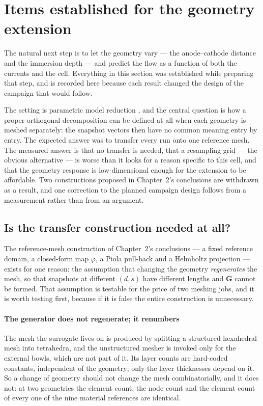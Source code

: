 \documentclass[11pt,a4paper]{article}
\newcommand{\vect}[1]{\mathbf{#1}}
\theoremstyle{plain}
\theoremstyle{definition}
\theoremstyle{remark}
\begin{document}
\section{Items established for the geometry extension}
\label{sec:geometry}

The natural next step is to let the geometry vary --- the anode--cathode distance
and the immersion depth --- and predict the flow as a function of both the
currents and the cell. Everything in this section was established while
preparing that step, and is recorded here because each result changed the design
of the campaign that would follow.

The setting is parametric model reduction \cite{benner}, and the central
question is how a proper orthogonal decomposition can be defined at all when
each geometry is meshed separately: the snapshot vectors then have no common
meaning entry by entry. The expected answer was to transfer every run onto one
reference mesh. The measured answer is that no transfer is needed, that a
resampling grid --- the obvious alternative --- is worse than it looks for a
reason specific to this cell, and that the geometry response is low-dimensional
enough for the extension to be affordable. Two constructions proposed in
Chapter~2's conclusions are withdrawn as a result, and one correction to the
planned campaign design follows from a measurement rather than from an
argument.

\subsection{Is the transfer construction needed at all?}
\label{sec:option0}

The reference-mesh construction of Chapter~2's conclusions --- a fixed reference
domain, a closed-form map $\varphi$, a Piola pull-back and a Helmholtz
projection --- exists for one reason: the assumption that changing the geometry
\emph{regenerates} the mesh, so that snapshots at different $(d,s)$ have
different lengths and $\vect{G}$ cannot be formed. That assumption is testable
for the price of two meshing jobs, and it is worth testing first, because if it
is false the entire construction is unnecessary.

\paragraph{The generator does not regenerate; it renumbers}
The mesh the surrogate lives on is produced by splitting a structured
hexahedral mesh into tetrahedra, and the unstructured mesher is invoked only for
the external bowls, which are not part of it. Its layer counts are hard-coded
constants, independent of the geometry; only the layer thicknesses depend on it.
So a change of geometry should not change the mesh combinatorially, and it does
not: at two geometries the element count, the node count and the element count
of every one of the nine material references are identical.
\end{document}
